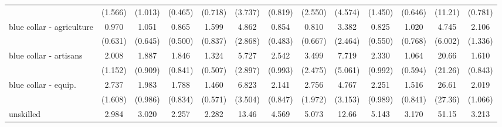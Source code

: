 {\begin{tabular}{l*{12}{c}}
                    &     (1.566)         &     (1.013)         &     (0.465)         &     (0.718)         &     (3.737)         &     (0.819)         &     (2.550)         &     (4.574)         &     (1.450)         &     (0.646)         &     (11.21)         &     (0.781)         \\
[1em]
blue collar - agriculture&       0.970         &       1.051         &       0.865         &       1.599         &       4.862\sym{**} &       0.854         &       0.810         &       3.382         &       0.825         &       1.020         &       4.745         &       2.106         \\
                    &     (0.631)         &     (0.645)         &     (0.500)         &     (0.837)         &     (2.868)         &     (0.483)         &     (0.667)         &     (2.464)         &     (0.550)         &     (0.768)         &     (6.002)         &     (1.336)         \\
[1em]
blue collar - artisans&       2.008         &       1.887         &       1.846         &       1.324         &       5.727\sym{***}&       2.542\sym{*}  &       3.499         &       7.719\sym{**} &       2.330\sym{*}  &       1.064         &       20.66\sym{**} &       1.610         \\
                    &     (1.152)         &     (0.909)         &     (0.841)         &     (0.507)         &     (2.897)         &     (0.993)         &     (2.475)         &     (5.061)         &     (0.992)         &     (0.594)         &     (21.26)         &     (0.843)         \\
[1em]
blue collar - equip.&       2.737         &       1.983         &       1.788         &       1.460         &       6.823\sym{***}&       2.141         &       2.756         &       4.767\sym{*}  &       2.251         &       1.516         &       26.61\sym{**} &       2.019         \\
                    &     (1.608)         &     (0.986)         &     (0.834)         &     (0.571)         &     (3.504)         &     (0.847)         &     (1.972)         &     (3.153)         &     (0.989)         &     (0.841)         &     (27.36)         &     (1.066)         \\
[1em]
unskilled           &       2.984         &       3.020\sym{*}  &       2.257         &       2.282\sym{*}  &       13.46\sym{***}&       4.569\sym{***}&       5.073\sym{*}  &       12.66\sym{***}&       5.143\sym{***}&       3.170\sym{*}  &       51.15\sym{***}&       3.213\sym{*}  \\

\end{tabular}}
